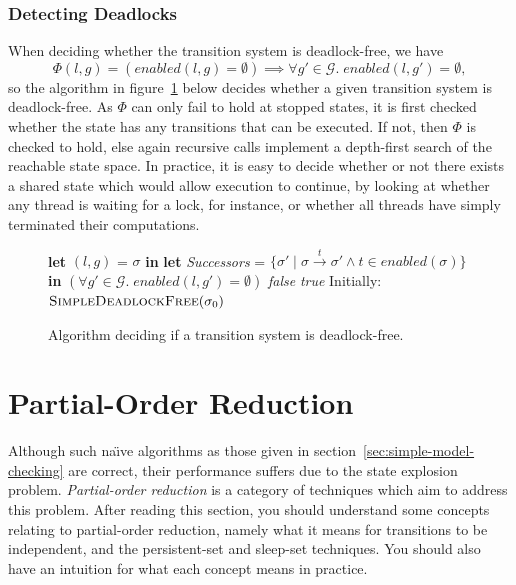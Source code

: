 \documentclass[12pt,a4paper,twoside,openright]{report}
\newcommand{\Let}[2]{\State \textbf{let} #1 = #2 \textbf{in}}
\begin{document}
\subsubsection{Detecting Deadlocks}
When deciding whether the transition system
is deadlock-free, we have
\[
	\Phi(l, g) = (\textit{enabled}(l, g) = \emptyset)
	\implies \forall g' \in \mathcal{G}. \;
	\textit{enabled}(l, g') = \emptyset,
\]
so the algorithm in figure~\ref{fig:simple-deadlock-free}
below decides whether a given transition system
is deadlock-free. As $\Phi$ can only fail to hold
at stopped states, it is first
checked whether the state has any
transitions that can be executed. If not, then
$\Phi$ is checked to hold, else again recursive calls implement a
depth-first search of the reachable state space.
In practice, it is easy to decide whether or not
there exists a shared state which would allow
execution to continue, by looking at whether
any thread is waiting for a lock, for instance,
or whether all threads have simply terminated
their computations.

\begin{figure}
	\begin{algorithmic}[1]
		\Let{$(l, g)$}{$\sigma$}
		\Let{\textit{Successors}}{$\{\sigma' \mid \sigma \xrightarrow{t}
			\sigma' \wedge t \in \textit{enabled}(\sigma)\}$}
		\State\Return $(\forall g' \in \mathcal{G}.\; \textit{enabled}(l, g')
				= \emptyset)$
			\Else
					\Return \textit{false}
				\EndIf
			\EndFor
		\State \Return \textit{true}
		\EndIf
		\EndProcedure
		\State
		\State Initially: $\textsc{SimpleDeadlockFree}(\sigma_0)$
	\end{algorithmic}
	\caption{Algorithm deciding if a transition system is deadlock-free.}
	\label{fig:simple-deadlock-free}
\end{figure}

\section{Partial-Order Reduction}


Although such na\"{\i}ve algorithms as those given
in section~\ref{sec:simple-model-checking}
are correct, their performance suffers due to
the state explosion problem.
\emph{Partial-order reduction} is a category of
techniques which aim to address this problem.
After reading this section, you should
understand some concepts
relating to partial-order reduction, namely
what it means for transitions to be independent,
and the persistent-set and sleep-set techniques.
You should also have an intuition for
what each concept means in practice.
\end{document}
